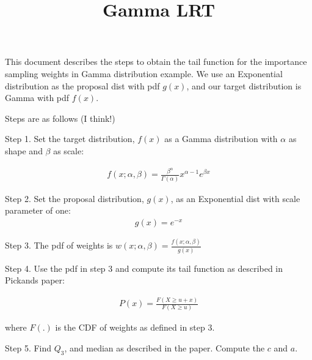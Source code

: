 \documentclass{article}
\title{Gamma LRT}
\date{}
\begin{document}
\maketitle

This document describes the steps to obtain the tail function for the importance sampling weights in Gamma distribution example. 
We use an Exponential distribution as the proposal dist with pdf $g(x)$, and our target distribution is Gamma with pdf $f(x)$.

Steps are as follows (I think!)

Step 1. Set the target distribution, $f(x)$ as a Gamma distribution with $\alpha$ as shape and $\beta$ as scale:

\begin{align}
    f(x;\alpha,\beta) = \frac{\beta^{\alpha}}{\Gamma(\alpha)} x^{\alpha-1} e^{\beta x}
\end{align}

Step 2. Set the proposal distribution, $g(x)$, as an Exponential dist with scale parameter of one:
\begin{align}
    g(x) = e^{-x}
\end{align}

Step 3. The pdf of weights is $w(x;\alpha,\beta) = \frac{f(x;\alpha,\beta)}{g(x)}$

Step 4. Use the pdf in step 3 and compute its tail function as described in Pickands paper:

\begin{align}
    P(x) = \frac{F(X \geq u+x)}{F(X \geq u)}
\end{align}

where $F(.)$ is the CDF of weights as defined in step 3.

Step 5. Find $Q_3$, and median as described in the paper. Compute the $c$ and $a$. 
\end{document}
